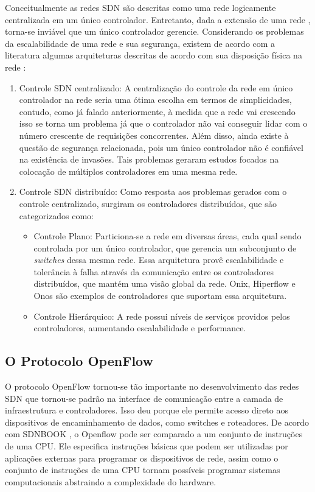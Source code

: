 Conceitualmente as redes SDN são descritas como uma rede logicamente centralizada em um único controlador. Entretanto, dada a extensão de uma rede , torna-se inviável que um único controlador gerencie. Considerando os problemas da escalabilidade de uma rede e sua segurança, existem  de acordo com a literatura algumas arquiteturas descritas de acordo com sua disposição física na rede \cite{bannour}:

\begin{enumerate}
    \item Controle SDN centralizado: A centralização do controle da rede em único controlador na rede seria uma ótima escolha em termos de simplicidades, contudo, como já falado anteriormente, à medida que a rede vai crescendo isso se torna um problema já que o controlador não vai conseguir lidar com o número crescente de requisições concorrentes. Além disso, ainda existe à questão de segurança relacionada, pois um único controlador não é confiável na existência de invasões. Tais problemas geraram estudos focados na colocação de múltiplos controladores em uma mesma rede.
    
    \item  Controle SDN distribuído: Como resposta aos problemas gerados com o controle centralizado, surgiram os controladores distribuídos, que são categorizados como:
    \begin{itemize}

        \item Controle Plano: Particiona-se a rede em diversas áreas, cada qual sendo controlada por um único controlador, que gerencia um subconjunto de \textit{switches} dessa mesma rede. Essa arquitetura provê escalabilidade e tolerância à falha através da comunicação entre os controladores distribuídos, que mantém uma visão global da rede. Onix, Hiperflow e Onos são exemplos de controladores que suportam essa arquitetura.
        
        \item Controle Hierárquico: A rede possui níveis de serviços providos pelos controladores, aumentando escalabilidade e performance.
    \end{itemize}
\end{enumerate}{}

\subsection{O Protocolo OpenFlow}

O protocolo OpenFlow tornou-se tão importante no desenvolvimento das redes SDN que tornou-se padrão na interface de comunicação entre a camada de infraestrutura e controladores. Isso deu porque ele permite acesso direto aos dispositivos de encaminhamento de dados, como switches e roteadores. De acordo com SDNBOOK , o Openflow pode ser comparado a um conjunto de instruções de uma CPU. Ele especifica instruções básicas que podem ser utilizadas por aplicações externas para programar os dispositivos de rede, assim como o conjunto de instruções de uma CPU tornam possíveis programar sistemas computacionais abstraindo a complexidade do hardware.


